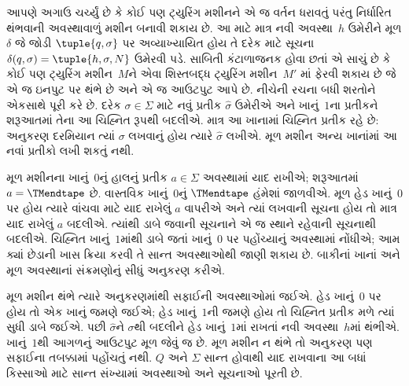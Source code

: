\documentclass[../../../include/open-logic-section]{subfiles}
\begin{document}
\begin{explain}
આપણે અગાઉ ચર્ચ્યું છે કે કોઈ પણ ટ્યુરિંગ મશીનને એ જ
વર્તન ધરાવતું પરંતુ નિર્ધારિત થંભવાની અવસ્થાવાળું મશીન
બનાવી શકાય છે. આ માટે માત્ર નવી અવસ્થા~$h$ ઉમેરીને
મૂળ $\delta$ જે જોડી $\tuple{q,\sigma}$ પર અવ્યાખ્યાયિત
હોય તે દરેક માટે સૂચના
$\delta(q, \sigma) = \tuple{h, \sigma, N}$ ઉમેરવી પડે.
સાબિતી કંટાળાજનક હોવા છતાં એ સાચું છે કે કોઈ પણ
ટ્યુરિંગ મશીન~$M$ને એવા શિસ્તબદ્ધ ટ્યુરિંગ મશીન~$M'$
માં ફેરવી શકાય છે જે એ જ ઇનપુટ પર થંભે છે અને એ જ
આઉટપુટ આપે છે. નીચેની રચના બધી શરતોને એકસાથે પૂરી કરે છે.
દરેક $\sigma\in\Sigma$ માટે નવું પ્રતીક $\widehat\sigma$
ઉમેરીએ અને ખાનું~$1$ના પ્રતીકને શરૂઆતમાં તેના આ ચિહ્નિત
રૂપથી બદલીએ. માત્ર આ ખાનામાં ચિહ્નિત પ્રતીક રહે છે:
અનુકરણ દરમિયાન ત્યાં $\sigma$ લખવાનું હોય ત્યારે
$\widehat\sigma$ લખીએ. મૂળ મશીન અન્ય ખાનાંમાં આ નવાં
પ્રતીકો લખી શકતું નથી.

મૂળ મશીનના ખાનું~$0$નું હાલનું પ્રતીક $a\in\Sigma$
અવસ્થામાં યાદ રાખીએ; શરૂઆતમાં $a=\TMendtape$ છે.
વાસ્તવિક ખાનું~$0$નું $\TMendtape$ હંમેશાં જાળવીએ.
મૂળ હેડ ખાનું~$0$ પર હોય ત્યારે વાંચવા માટે યાદ રાખેલું
$a$ વાપરીએ અને ત્યાં લખવાની સૂચના હોય તો માત્ર યાદ રાખેલું
$a$ બદલીએ. ત્યાંથી ડાબે જવાની સૂચનાને એ જ સ્થાને રહેવાની
સૂચનાથી બદલીએ. ચિહ્નિત ખાનું~$1$માંથી ડાબે જતાં ખાનું~$0$
પર પહોંચ્યાનું અવસ્થામાં નોંધીએ; આમ ક્યાં છેડાની ખાસ
ક્રિયા કરવી તે સાન્ત અવસ્થાઓથી જાણી શકાય છે. બાકીનાં
ખાનાં અને મૂળ અવસ્થાનાં સંક્રમણોનું સીધું અનુકરણ કરીએ.

મૂળ મશીન થંભે ત્યારે અનુકરણમાંથી સફાઈની અવસ્થાઓમાં
જઈએ. હેડ ખાનું~$0$ પર હોય તો એક ખાનું જમણે જઈએ;
હેડ ખાનું~$1$ની જમણે હોય તો ચિહ્નિત પ્રતીક મળે ત્યાં
સુધી ડાબે જઈએ. પછી $\widehat\sigma$ને $\sigma$થી
બદલીને હેડ ખાનું~$1$માં રાખતાં નવી અવસ્થા~$h$માં થંભીએ.
ખાનું~$1$થી આગળનું આઉટપુટ મૂળ જેવું જ છે. મૂળ મશીન
ન થંભે તો અનુકરણ પણ સફાઈના તબક્કામાં પહોંચતું નથી.
$Q$ અને $\Sigma$ સાન્ત હોવાથી યાદ રાખવાના આ બધાં કિસ્સાઓ
માટે સાન્ત સંખ્યામાં અવસ્થાઓ અને સૂચનાઓ પૂરતી છે.
\end{explain}
\end{document}
